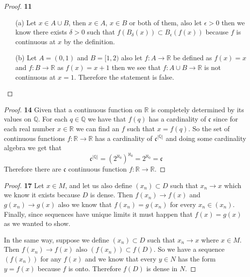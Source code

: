 \documentclass[11pt]{article}
\newcommand{\Q}{\mathbb{Q}}
\newcommand{\R}{\mathbb{R}}
\theoremstyle{definition}
\begin{document}
    \begin{proof}{\textbf{11}}
        \begin{itemize}
            \item [(a)] Let $x \in A \cup B$, then $x \in A$, $x \in B$ or both
            of them, also let $\epsilon > 0$ then we know there exists
            $\delta > 0$ such that $f(B_\delta(x)) \subset B_\epsilon(f(x))$
            because $f$ is continuous at $x$ by the definition.
            \item [(b)] Let $A = (0,1)$ and $B = [1,2)$ also let $f:A \to \R$ be
            defined as $f(x) = x$ and $f: B\to\R$ as $f(x) = x + 1$ then we
            see that $f:A \cup B \to \R$ is not continuous at $x=1$. Therefore
            the statement is false.            
        \end{itemize}
    \end{proof}
    \begin{proof}{\textbf{14}}
        Given that a continuous function on $\R$ is completely determined by its
        values on $\Q$. For each $q \in \Q$ we have that $f(q)$ has a
        cardinality of $\mathfrak{c}$ since for each real number $x \in \R$ we
        can find an $f$ such that $x = f(q)$. So the set of continuous functions
        $f: \R \to \R$ has a cardinality of $\mathfrak{c}^{|\Q|}$ and doing some
        cardinality algebra we get that
        $$\mathfrak{c}^{|\Q|} = {(2^{\aleph_0})}^{\aleph_0} = 2^{\aleph_0} = \mathfrak{c}$$
        Therefore there are $\mathfrak{c}$ continuous function $f: \R \to \R$. 
    \end{proof}
    \begin{proof}{\textbf{17}}
        Let $x \in M$, and let us also define $(x_n) \subset D$ such that
        $x_n \to x$ which we know it exists because $D$ is dense. Then
        $f(x_n) \to f(x)$ and $g(x_n) \to g(x)$ also we know that
        $f(x_n) = g(x_n)$ for every $x_n \in (x_n)$. Finally, since sequences
        have unique limits it must happen that $f(x) = g(x)$ as we wanted to
        show.

        In the same way, suppose we define $(x_n) \subset D$ such that
        $x_n \to x$ where $x \in M$. Then $f(x_n) \to f(x)$ also
        $(f(x_n)) \subset f(D)$. So we have a sequence $(f(x_n))$ for any
        $f(x)$ and we know that every $y \in N$ has the form $y = f(x)$
        because $f$ is onto. Therefore $f(D)$ is dense in $N$.
    \end{proof}
\cleardoublepage
\end{document}
